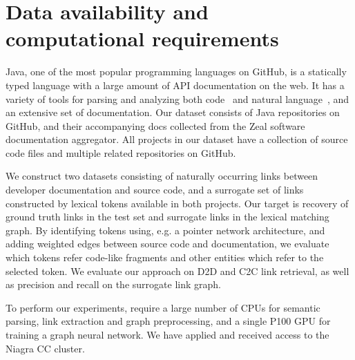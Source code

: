 \documentclass{article}
\begin{document}
\section{Data availability and computational requirements}

Java, one of the most popular programming languages on GitHub, is a statically typed language with a large amount of API documentation on the web. It has a variety of tools for parsing and analyzing both code~\citep{kovalenko2019pathminer} and natural language~\citep{manning2014stanford, grella2018non}, and an extensive set of documentation. Our dataset consists of Java repositories on GitHub, and their accompanying docs collected from the Zeal software documentation aggregator. All projects in our dataset have a collection of source code files and multiple related repositories on GitHub.

We construct two datasets consisting of naturally occurring links between developer documentation and source code, and a surrogate set of links constructed by lexical tokens available in both projects. Our target is recovery of ground truth links in the test set and surrogate links in the lexical matching graph. By identifying tokens using, e.g. a pointer network architecture, and adding weighted edges between source code and documentation, we evaluate which tokens refer code-like fragments and other entities which refer to the selected token. We evaluate our approach on D2D and C2C link retrieval, as well as precision and recall on the surrogate link graph.

To perform our experiments, require a large number of CPUs for semantic parsing, link extraction and graph preprocessing, and a single P100 GPU for training a graph neural network. We have applied and received access to the Niagra CC cluster.



\end{document}
